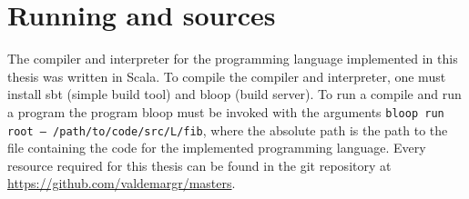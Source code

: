 \section{Running and sources}
The compiler and interpreter for the programming language implemented in this thesis was written in Scala.
To compile the compiler and interpreter, one must install sbt (simple build tool) and bloop (build server).
To run a compile and run a program the program bloop must be invoked with the arguments \texttt{bloop run root -- /path/to/code/src/L/fib}, where the absolute path is the path to the file containing the code for the implemented programming language.
Every resource required for this thesis can be found in the git repository at \url{https://github.com/valdemargr/masters}.
